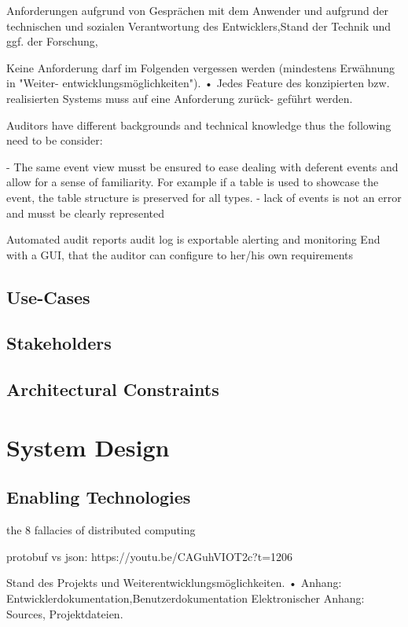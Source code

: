 Anforderungen aufgrund von Gesprächen mit dem Anwender und aufgrund der technischen
und sozialen Verantwortung des Entwicklers,Stand der Technik und ggf. der Forschung,

Keine Anforderung darf im Folgenden vergessen werden (mindestens Erwähnung in "Weiter- entwicklungsmöglichkeiten").
• Jedes Feature des konzipierten bzw. realisierten Systems muss auf eine Anforderung zurück- geführt werden.

Auditors have different backgrounds and technical knowledge thus the following need to be consider:

- The same event view musst be ensured to ease dealing with deferent events and allow for a sense of familiarity. For example if a table is used to showcase the event, the table structure is preserved for all types.
- lack of events is not an error and musst be clearly represented

Automated audit reports 
audit log is exportable
alerting and monitoring
End with a GUI, that the auditor can configure to her/his own requirements


\subsection{Use-Cases}

\subsection{Stakeholders}

\subsection{Architectural Constraints}

\section{System Design}

\subsection{Enabling Technologies}

the 8 fallacies of distributed computing

protobuf vs json: https://youtu.be/CAGuhVIOT2c?t=1206

Stand des Projekts und Weiterentwicklungsmöglichkeiten.
• Anhang: Entwicklerdokumentation,Benutzerdokumentation
Elektronischer Anhang: Sources, Projektdateien.

